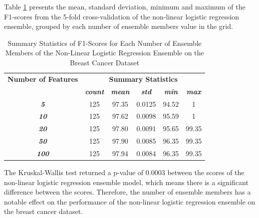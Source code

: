\documentclass[10pt, conference]{IEEEtran}
\begin{document}
Table \ref{table: BC_member_nonlinear_performance_metrics} presents the mean, standard deviation, minimum and maximum of the
F1-scores from the 5-fold cross-validation of the non-linear logistic regression ensemble, grouped by each number of ensemble members
value in the grid.
\begin{table}[H]
    \caption{Summary Statistics of F1-Scores for Each Number of Ensemble Members of the Non-Linear Logistic Regression Ensemble on the Breast Cancer Dataset}
    \begin{center}
        \begin{tabular}{|c||c|c|c|c|c|}
            \hline
            \textbf{Number of Features}&\multicolumn{5}{|c|}{\textbf{Summary Statistics}} \\
            \cline{2-6}
                                &\textbf{\textit{count}} & \textbf{\textit{mean}} & \textbf{\textit{std}} & \textbf{\textit{min}} & \textbf{\textit{max}}\\
            \hline
            \textbf{\textit{5}} & 125 & 97.35 & 0.0125 & 94.52 & 1 \\
            \textbf{\textit{10}} & 125 & 97.62 & 0.0098 & 95.59 & 1 \\
            \textbf{\textit{20}} & 125 & 97.80 & 0.0091 & 95.65 & 99.35 \\
            \textbf{\textit{50}} & 125 & 97.90 & 0.0085 & 96.35 & 99.35 \\
            \textbf{\textit{100}} & 125 & 97.94 & 0.0084 & 96.35 & 99.35 \\
            \hline
        \end{tabular}
    \end{center}
    \label{table: BC_member_nonlinear_performance_metrics}
\end{table}
The Kruskal-Wallis test returned a p-value of 0.0003 between the scores of the non-linear logistic regression ensemble model,
which means there is a significant difference between the scores. Therefore, the number of ensemble members
has a notable effect on the performance of the non-linear logistic regression ensemble on the breast cancer dataset.
\end{document}
